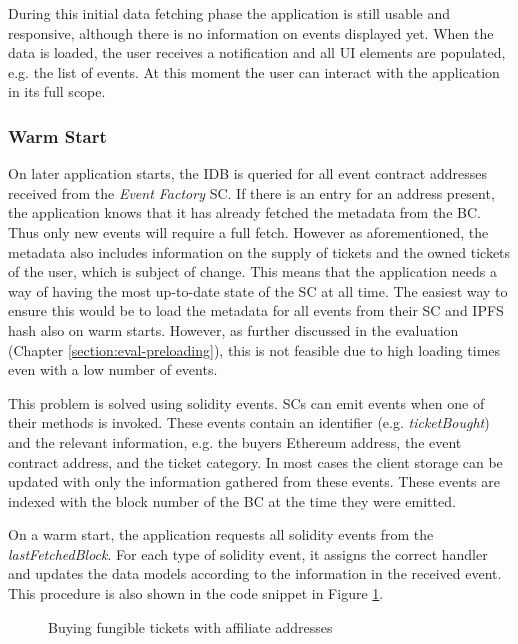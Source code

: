 During this initial data fetching phase the application is still usable and responsive, although there is no information on events displayed yet. When the data is loaded, the user receives a notification and all UI elements are populated, e.g. the list of events.
At this moment the user can interact with the application in its full scope. 

\subsubsection{Warm Start}

On later application starts, the IDB is queried for all event contract addresses received from the \textit{Event Factory} SC. If there is an entry for an address present, the application knows that it has already fetched the metadata from the BC. Thus only new events will require a full fetch. However as aforementioned, the metadata also includes information on the supply of tickets and the owned tickets of the user, which is subject of change. This means that the application needs a way of having the most up-to-date state of the SC at all time. The easiest way to ensure this would be to load the metadata for all events from their SC and IPFS hash also on warm starts. However, as further discussed in the evaluation (Chapter \ref{section:eval-preloading}), this is not feasible due to high loading times even with a low number of events.

This problem is solved using solidity events. SCs can emit events when one of their methods is invoked. These events contain an identifier (e.g. \textit{ticketBought}) and the relevant information, e.g. the buyers Ethereum address, the event contract address, and the ticket category. In most cases the client storage can be updated with only the information gathered from these events. These events are indexed with the block number of the BC at the time they were emitted.

On a warm start, the application requests all solidity events from the \textit{lastFetchedBlock}. For each type of solidity event, it assigns the correct handler and updates the data models according to the information in the received event. This procedure is also shown in the code snippet in Figure \ref{code:eventLoading}.

\begin{figure}[hbt]
    
    \caption{Buying fungible tickets with affiliate addresses}
    \label{code:eventLoading}
\end{figure}

